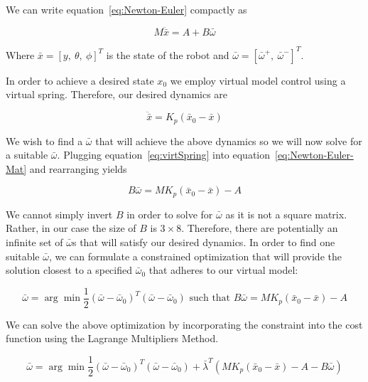 \documentclass{article}
\begin{document}
We can write equation~\ref{eq:Newton-Euler} compactly as

\begin{equation}
	M \ddot{\bar{x}} = A + B \bar{\omega}
	\label{eq:Newton-Euler-Mat}
\end{equation}

Where $\bar{x} = [y, \ \theta, \ \phi]^T$ is the state of the robot and $\bar{\omega} = [\bar{\omega}^+, \ \bar{\omega}^-]^T$.

In order to achieve a desired state $x_0$ we employ virtual model control using a virtual spring. Therefore, our desired dynamics are

\begin{equation}
	\ddot{\bar{x}} = K_p (\bar{x}_0 - \bar{x})
	\label{eq:virtSpring}
\end{equation}

We wish to find a $\bar{\omega}$ that will achieve the above dynamics so we will now solve for a suitable $\bar{\omega}$. Plugging equation~\ref{eq:virtSpring} into equation~\ref{eq:Newton-Euler-Mat} and rearranging yields

\begin{equation}
	B \bar{\omega} = M K_p (\bar{x}_0 - \bar{x}) - A
\end{equation}

We cannot simply invert $B$ in order to solve for $\bar{\omega}$ as it is not a square matrix.  Rather, in our case the size of $B$ is $3 \times 8$. Therefore, there are potentially an infinite set of $\bar{\omega}$s that will satisfy our desired dynamics. In order to find one suitable $\bar{\omega}$, we can formulate a constrained optimization that will provide the solution closest to a specified $\bar{\omega}_0$ that adheres to our virtual model:

\begin{equation}
	\bar{\omega} = \arg \min \frac{1}{2} (\bar{\omega} - \bar{\omega}_0)^T (\bar{\omega} - \bar{\omega}_0) \textrm{~such that~} B \bar{\omega} = M K_p (\bar{x}_0 - \bar{x}) - A
\end{equation}

We can solve the above optimization by incorporating the constraint into the cost function using the Lagrange Multipliers Method.

\begin{equation}
	\bar{\omega} = \arg \min \frac{1}{2} (\bar{\omega} - \bar{\omega}_0)^T (\bar{\omega} - \bar{\omega}_0) + \bar{\lambda}^T  (M K_p (\bar{x}_0 - \bar{x}) - A - B \bar{\omega})
\end{equation}
\end{document}

